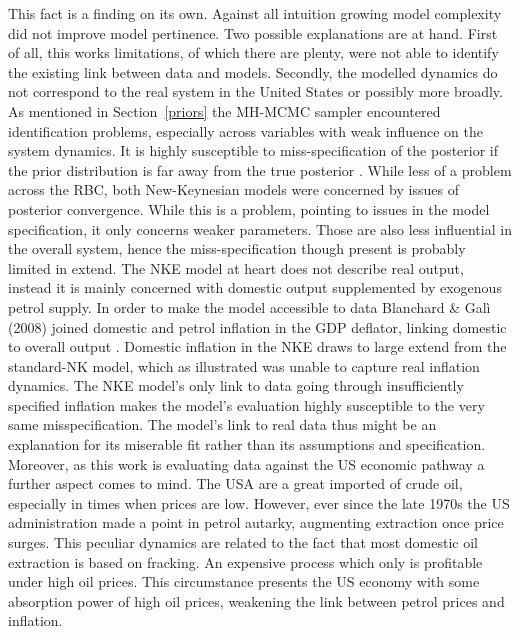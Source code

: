 \documentclass[12pt,a4paper,english]{article} %
\begin{document}
	This fact is a finding on its own. Against all intuition growing model complexity did not improve model pertinence. Two possible explanations are at hand. First of all, this works limitations, of which there are plenty, were not able to identify the existing link between data and models. Secondly, the modelled dynamics do not correspond to the real system in the United States or possibly more broadly. 
	As mentioned in Section~\ref{priors} the MH-MCMC sampler encountered identification problems, especially across variables with weak influence on the system dynamics. It is highly susceptible to miss-specification of the posterior if the prior distribution is far away from the true posterior \cite{herbst_bayesian_2016}. While less of a problem across the RBC, both New-Keynesian models were concerned by issues of posterior convergence. While this is a problem, pointing to issues in the model specification, it only concerns weaker parameters. Those are also less influential in the overall system, hence the miss-specification though present is probably limited in extend.
	The NKE model at heart does not describe real output, instead it is mainly concerned with domestic output supplemented by exogenous petrol supply. In order to make the model accessible to data Blanchard \& Galì (2008) joined domestic and petrol inflation in the GDP deflator, linking domestic to overall output \cite{blanchard_macroeconomic_2007}. Domestic inflation in the NKE draws to large extend from the standard-NK model, which as illustrated was unable to capture real inflation dynamics. The NKE model's only link to data going through insufficiently specified inflation makes the model's evaluation highly susceptible to the very same misspecification. The model's link to real data thus might be an explanation for its miserable fit rather than its assumptions and specification.
	Moreover, as this work is evaluating data against the US economic pathway a further aspect comes to mind. The USA are a great imported of crude oil, especially in times when prices are low. However, ever since the late 1970s the US administration made a point in petrol autarky, augmenting extraction once price surges. This peculiar dynamics are related to the fact that most domestic oil extraction is based on fracking. An expensive process which only is profitable under high oil prices. This circumstance presents the US economy with some absorption power of high oil prices, weakening the link between petrol prices and inflation. 
	
\end{document}
